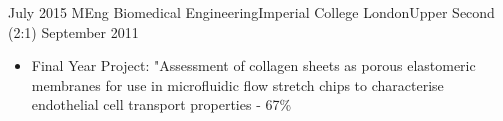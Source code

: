 \begin{education}
  \degree
        {July 2015}   {MEng Biomedical Engineering}{Imperial College London}{Upper Second (2:1)}
    {September 2011} {
                      \begin{itemize}
                        \item Final Year Project: "Assessment of collagen sheets as porous elastomeric
                              membranes for use in microfluidic flow stretch chips to
                              characterise endothelial cell transport properties - 67\%
                      \end{itemize}
                    }
  \emptySeparator
\end{education}